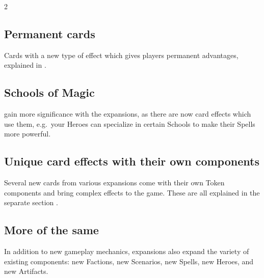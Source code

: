 \begin{multicols*}{2}
\subsection*{Permanent cards}
Cards with a new type of effect which gives players permanent advantages, explained in .

\subsection*{Schools of Magic}
 gain more significance with the expansions, as there are now card effects which use them, e.g.~your Heroes can specialize in certain Schools to make their Spells more powerful.

\subsection*{Unique card effects with their own components}
Several new cards from various expansions come with their own Token components and bring complex effects to the game.
These are all explained in the separate section .

\subsection*{More of the same}
In addition to new gameplay mechanics, expansions also expand the variety of existing components: new Factions, new Scenarios, new Spells, new Heroes, and new Artifacts.

\end{multicols*}
\pagebreak


